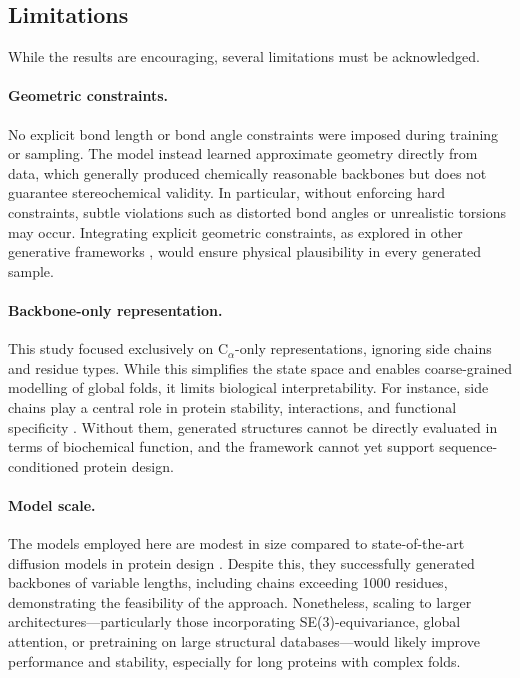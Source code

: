 \documentclass[a4paper,12pt]{article}
\begin{document}
\subsection{Limitations}\label{subsec:limitations}
While the results are encouraging, several limitations must be acknowledged.
\paragraph{Geometric constraints.}  
No explicit bond length or bond angle constraints were imposed during training or sampling. The model instead learned approximate geometry directly from data, which generally produced chemically reasonable backbones but does not guarantee stereochemical validity. In particular, without enforcing hard constraints, subtle violations such as distorted bond angles or unrealistic torsions may occur. Integrating explicit geometric constraints, as explored in other generative frameworks \citep{watsonNovoDesignProtein2023,yimDiffusionModelsProtein2024,wuProteinStructureGeneration2024}, would ensure physical plausibility in every generated sample.

\paragraph{Backbone-only representation.}  
This study focused exclusively on C\(_\alpha\)-only representations, ignoring side chains and residue types. While this simplifies the state space and enables coarse-grained modelling of global folds, it limits biological interpretability. For instance, side chains play a central role in protein stability, interactions, and functional specificity \citep{creighton1993proteins,branden2012IntroductionProteinStructure}. Without them, generated structures cannot be directly evaluated in terms of biochemical function, and the framework cannot yet support sequence-conditioned protein design.

\paragraph{Model scale.}  
The models employed here are modest in size compared to state-of-the-art diffusion models in protein design \citep{wuProteinStructureGeneration2024,watsonNovoDesignProtein2023}. Despite this, they successfully generated backbones of variable lengths, including chains exceeding 1000 residues, demonstrating the feasibility of the approach. Nonetheless, scaling to larger architectures—particularly those incorporating SE(3)-equivariance, global attention, or pretraining on large structural databases—would likely improve performance and stability, especially for long proteins with complex folds.
\end{document}
